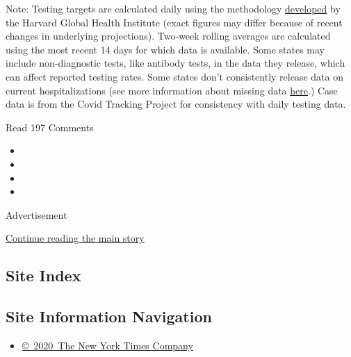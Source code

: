Note: Testing targets are calculated daily using the methodology
\href{https://globalepidemics.org/july-6-2020-state-testing-targets/}{developed}
by the Harvard Global Health Institute (exact figures may differ because
of recent changes in underlying projections). Two-week rolling averages
are calculated using the most recent 14 days for which data is
available. Some states may include non-diagnostic tests, like antibody
tests, in the data they release, which can affect reported testing
rates. Some states don't consistently release data on current
hospitalizations (see more information about missing data
\href{https://covidtracking.com/data}{here}.) Case data is from the
Covid Tracking Project for consistency with daily testing data.

Read 197 Comments

\begin{itemize}
\item
\item
\item
\item
\end{itemize}

Advertisement

\protect\hyperlink{after-bottom}{Continue reading the main story}

\hypertarget{site-index}{%
\subsection{Site Index}\label{site-index}}

\hypertarget{site-information-navigation}{%
\subsection{Site Information
Navigation}\label{site-information-navigation}}

\begin{itemize}
\tightlist
\item
  \href{https://help.nytimes.com/hc/en-us/articles/115014792127-Copyright-notice}{©~2020~The
  New York Times Company}
\end{itemize}

